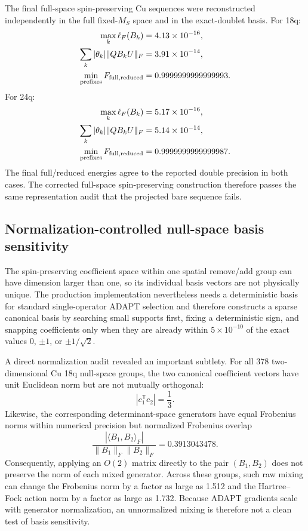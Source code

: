 \documentclass[
 aip,
 jcp,
 amsmath,amssymb,
 preprint
]{revtex4-2}
\begin{document}
The final full-space spin-preserving Cu sequences were reconstructed independently in the full fixed-$M_S$ space and in the exact-doublet basis.
For 18q:
\begin{align}
\max_k\ell_F(B_k)&=4.13\times10^{-16},\\
\sum_k|\theta_k|\|QB_kU\|_F&=3.91\times10^{-14},\\
\min_{\rm prefixes}F_{\rm full,reduced}
&=0.9999999999999993.
\end{align}
For 24q:
\begin{align}
\max_k\ell_F(B_k)&=5.17\times10^{-16},\\
\sum_k|\theta_k|\|QB_kU\|_F&=5.14\times10^{-14},\\
\min_{\rm prefixes}F_{\rm full,reduced}
&=0.9999999999999987.
\end{align}
The final full/reduced energies agree to the reported double precision in both cases.
The corrected full-space spin-preserving construction therefore passes the same representation audit that the projected bare sequence fails.

\subsection{Normalization-controlled null-space basis sensitivity}

The spin-preserving coefficient space within one spatial remove/add group can have dimension larger than one, so its individual basis vectors are not physically unique.
The production implementation nevertheless needs a deterministic basis for standard single-operator ADAPT selection and therefore constructs a sparse canonical basis by searching small supports first, fixing a deterministic sign, and snapping coefficients only when they are already within $5\times10^{-10}$ of the exact values $0$, $\pm1$, or $\pm1/\sqrt2$.

A direct normalization audit revealed an important subtlety.
For all 378 two-dimensional Cu 18q null-space groups, the two canonical coefficient vectors have unit Euclidean norm but are not mutually orthogonal:
\begin{equation}
|c_1^\mathsf{T}c_2|=\frac13.
\end{equation}
Likewise, the corresponding determinant-space generators have equal Frobenius norms within numerical precision but normalized Frobenius overlap
\begin{equation}
\frac{|\langle B_1,B_2\rangle_F|}{\|B_1\|_F\|B_2\|_F}=0.3913043478.
\end{equation}
Consequently, applying an $O(2)$ matrix directly to the pair $(B_1,B_2)$ does not preserve the norm of each mixed generator.
Across these groups, such raw mixing can change the Frobenius norm by a factor as large as 1.512 and the Hartree--Fock action norm by a factor as large as 1.732.
Because ADAPT gradients scale with generator normalization, an unnormalized mixing is therefore not a clean test of basis sensitivity.
\end{document}
